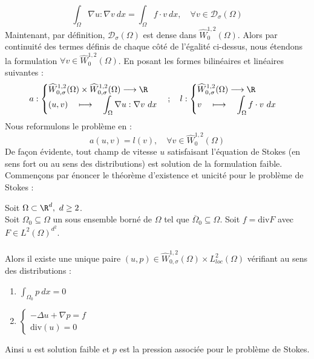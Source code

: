 $$ \int_{\Omega} \nabla u : \nabla v \ dx = \int_{\Omega} f \cdot v \ dx, \quad \forall v \in \mathcal{D}_{\sigma}(\Omega)$$
Maintenant, par définition, $\mathcal{D}_{\sigma}(\Omega)$ est dense dans $\widehat{W}_0^{1,2}(\Omega)$. Alors par continuité des termes définis de chaque côté de l'égalité ci-dessus, nous étendons la formulation $\forall v \in \widehat{W}_0^{1,2}(\Omega)$.
En posant les formes bilinéaires et linéaires suivantes :
\begin{align*}
    a : 
    \begin{cases}
        \widehat{W}_{0,\sigma}^{1,2}(\Omega) \times \widehat{W}_{0,\sigma}^{1,2}(\Omega) \longrightarrow \R \\
        \displaystyle (u,v) \quad \longmapsto \quad \int_{\Omega} \nabla u : \nabla v \ dx
    \end{cases}; \quad l :
    \begin{cases}
        \widehat{W}_{0,\sigma}^{1,2}(\Omega) \longrightarrow \R \\
        \displaystyle v \quad \longmapsto \quad  \int_{\Omega} f \cdot v \ dx 
    \end{cases}
\end{align*}
Nous reformulons le problème en :
$$ a(u,v) = l(v), \quad \forall v \in \widehat{W}_0^{1,2}(\Omega)$$
De façon évidente, tout champ de vitesse $u$ satisfaisant l'équation de Stokes (en sens fort ou au sens des distributions) est solution de la formulation faible. \\
Commençons par énoncer le théorème d'existence et unicité pour le problème de Stokes :
\begin{theorembox}
    \begin{theorem}
        Soit $\Omega \subset \R^d, \ d \geq 2$.\\ 
        Soit $\Omega_0 \subseteq \Omega$ un sous ensemble borné de $\Omega$ tel que $\overline{\Omega}_0 \subseteq \Omega$. Soit $f = \text{div}F$ avec $F \in L^2(\Omega)^{d^2}$.
        \\
        \\
        Alors il existe une unique paire $(u,p) \in \widehat{W}_{0,\sigma}^{1,2}(\Omega) \times L^2_{loc}(\Omega) $ vérifiant au sens des distributions :
        \begin{enumerate}
            \item $\displaystyle \int_{\Omega_0} p \ dx = 0$ 
            \item $\begin{cases}
                -\Delta u + \nabla p = f \\
                \text{div}(u) = 0
            \end{cases}$
        \end{enumerate}
        \vspace{1em}
        Ainsi $u$ est solution faible et $p$ est la pression associée pour le problème de Stokes.
    \end{theorem}
\end{theorembox} 
